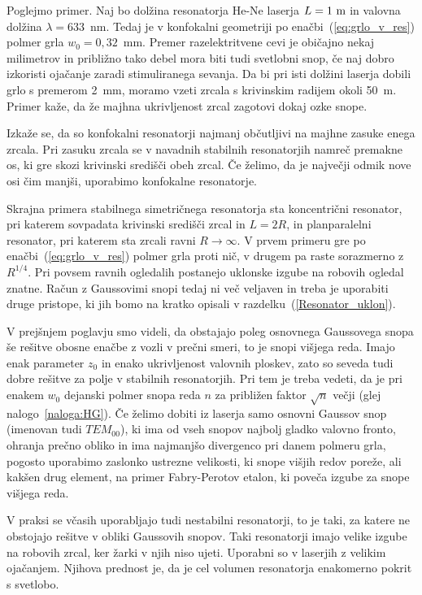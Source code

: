 Poglejmo primer. Naj bo dolžina resonatorja He-Ne laserja $L=1~\metre$ in valovna
dolžina $\lambda = 633$~nm. Tedaj je v konfokalni geometriji po enačbi~(\ref{eq:grlo_v_res})
polmer grla $w_{0}=0,32$~mm. Premer razelektritvene cevi je običajno
nekaj milimetrov in približno tako debel mora biti tudi svetlobni
snop, če naj dobro izkoristi ojačanje zaradi stimuliranega sevanja.
Da bi pri isti dolžini laserja dobili grlo s premerom 2~mm, moramo vzeti
zrcala s krivinskim radijem okoli 50~m. Primer kaže, da že majhna ukrivljenost 
zrcal zagotovi dokaj ozke snope.

\begin{remark}
Izkaže se, da so konfokalni resonatorji najmanj občutljivi na majhne zasuke enega zrcala. 
Pri zasuku zrcala se v navadnih stabilnih resonatorjih namreč premakne os, ki gre skozi 
krivinski središči obeh zrcal. Če želimo, da je največji odmik nove osi čim
manjši, uporabimo konfokalne resonatorje. 
\end{remark}

Skrajna primera stabilnega simetričnega resonatorja sta 
koncentrični resonator,
pri katerem sovpadata krivinski središči zrcal in $L=2R$, in planparalelni 
resonator, pri katerem sta zrcali ravni $R \to \infty$.
V prvem primeru gre po enačbi~(\ref{eq:grlo_v_res}) polmer grla proti nič, v drugem pa raste sorazmerno
z $R^{1/4}$. Pri povsem ravnih ogledalih postanejo uklonske
izgube na robovih ogledal znatne. Račun z Gaussovimi snopi tedaj ni več veljaven
in treba je uporabiti druge pristope, ki jih bomo na kratko opisali
v razdelku~(\ref{Resonator_uklon}).

V prejšnjem poglavju smo videli, da obstajajo poleg osnovnega Gaussovega
snopa še rešitve obosne enačbe z vozli v prečni smeri, to je snopi
višjega reda. Imajo enak parameter $z_{0}$ in enako ukrivljenost
valovnih ploskev, zato so seveda tudi dobre rešitve za polje v stabilnih
resonatorjih. Pri tem je treba vedeti, da je pri enakem $w_{0}$
dejanski polmer snopa reda $n$ za približen faktor $\sqrt{n}$ večji 
(glej nalogo~\ref{naloga:HG}). Če želimo dobiti iz laserja samo 
osnovni Gaussov snop (imenovan tudi $TEM_{00}$), ki ima od vseh snopov
najbolj gladko valovno fronto, ohranja prečno obliko in ima najmanjšo 
divergenco pri danem polmeru grla, pogosto uporabimo zaslonko
ustrezne velikosti, ki snope višjih redov poreže, ali kakšen drug
element, na primer Fabry-Perotov etalon, ki poveča izgube za snope višjega reda.
 
\begin{remark}
V praksi se včasih uporabljajo tudi nestabilni resonatorji, to je
taki, za katere ne obstojajo rešitve v obliki Gaussovih snopov. Taki
resonatorji imajo velike izgube na robovih zrcal, ker žarki v njih niso ujeti. 
Uporabni so v laserjih z velikim ojačanjem. Njihova prednost je, da je cel
volumen resonatorja enakomerno pokrit s svetlobo.
\end{remark}

